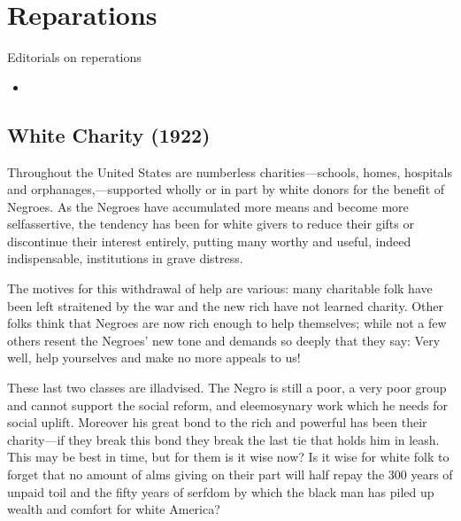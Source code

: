 \documentclass[letterpaper,10pt,english]{jupyterBook}
\begin{document}
\section{Reparations}
\label{\detokenize{Sections/reparations:reparations}}\label{\detokenize{Sections/reparations::doc}}
\sphinxAtStartPar
Editorials on reperations
\begin{itemize}
\item {} 
\sphinxAtStartPar
{\hyperref[\detokenize{Volumes/24/02/whitecharity::doc}]{}}

\end{itemize}


\subsection{White Charity (1922)}
\label{\detokenize{Volumes/24/02/whitecharity:white-charity-1922}}\label{\detokenize{Volumes/24/02/whitecharity::doc}}
\sphinxAtStartPar
Throughout the United States are numberless charities—schools, homes, hospitals and orphanages,—supported wholly or in part by white donors for the benefit of Negroes. As the Negroes have accumulated more means and become more self\sphinxhyphen{}assertive, the tendency has been for white givers to reduce their gifts or discontinue their interest entirely, putting many worthy and useful, indeed indispensable, institutions in grave distress.

\sphinxAtStartPar
The motives for this withdrawal of help are various: many charitable folk have been left straitened by the war and the new rich have not learned charity. Other folks think that Negroes are now rich enough to help themselves; while not a few others resent the Negroes’ new tone and demands so deeply that they say: Very well, help yourselves and make no more appeals to us!

\sphinxAtStartPar
These last two classes are ill\sphinxhyphen{}advised. The Negro is still a poor, a very poor group and cannot support the social reform, and eleemosynary work which he needs for social uplift. Moreover his great bond to the rich and powerful has been their charity—if they break this bond they break the last tie that holds him in leash. This may be best in time, but for them is it wise now? Is it wise for white folk to forget that no amount of alms­ giving on their part will half repay the 300 years of unpaid toil and the fifty years of serfdom by which the black man has piled up wealth and comfort for white America?
\end{document}
